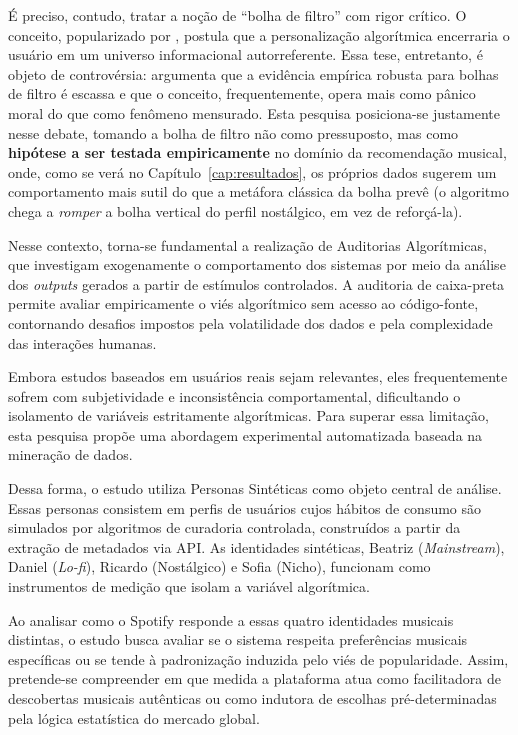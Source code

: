 \documentclass[12pt, %
openright,
oneside, %
a4paper,    %
english,   %
brazil]{facom-ufu-abntex2}
\begin{document}
É preciso, contudo, tratar a noção de ``bolha de filtro'' com rigor crítico. O
conceito, popularizado por , postula que a
personalização algorítmica encerraria o usuário em um universo informacional
autorreferente. Essa tese, entretanto, é objeto de controvérsia:
 argumenta que a evidência empírica robusta para
bolhas de filtro é escassa e que o conceito, frequentemente, opera mais como
pânico moral do que como fenômeno mensurado. Esta pesquisa posiciona-se
justamente nesse debate, tomando a bolha de filtro não como pressuposto, mas
como \textbf{hipótese a ser testada empiricamente} no domínio da recomendação
musical, onde, como se verá no Capítulo~\ref{cap:resultados}, os próprios
dados sugerem um comportamento mais sutil do que a metáfora clássica da bolha
prevê (o algoritmo chega a \emph{romper} a bolha vertical do perfil
nostálgico, em vez de reforçá-la).

Nesse contexto, torna-se fundamental a realização de Auditorias Algorítmicas,
que investigam exogenamente o comportamento dos sistemas por meio da análise dos
\emph{outputs} gerados a partir de estímulos controlados. A auditoria de
caixa-preta permite avaliar empiricamente o viés algorítmico sem acesso ao
código-fonte, contornando desafios impostos pela volatilidade dos dados e pela
complexidade das interações humanas.

Embora estudos baseados em usuários reais sejam relevantes, eles frequentemente
sofrem com subjetividade e inconsistência comportamental, dificultando o
isolamento de variáveis estritamente algorítmicas. Para superar essa limitação,
esta pesquisa propõe uma abordagem experimental automatizada baseada na
mineração de dados.

Dessa forma, o estudo utiliza Personas Sintéticas como objeto central de
análise. Essas personas consistem em perfis de usuários cujos hábitos de consumo
são simulados por algoritmos de curadoria controlada, construídos a partir da
extração de metadados via API. As identidades sintéticas, Beatriz
(\emph{Mainstream}), Daniel (\emph{Lo-fi}), Ricardo (Nostálgico) e Sofia (Nicho),
funcionam como instrumentos de medição que isolam a variável algorítmica.

Ao analisar como o Spotify responde a essas quatro identidades musicais
distintas, o estudo busca avaliar se o sistema respeita preferências musicais
específicas ou se tende à padronização induzida pelo viés de popularidade.
Assim, pretende-se compreender em que medida a plataforma atua como facilitadora
de descobertas musicais autênticas ou como indutora de escolhas pré-determinadas
pela lógica estatística do mercado global.
\end{document}
